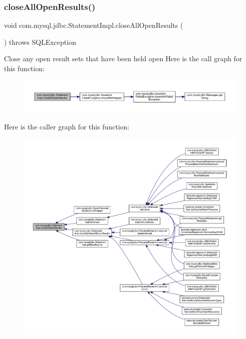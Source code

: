 \subsubsection{\texorpdfstring{close\+All\+Open\+Results()}{closeAllOpenResults()}}
{\footnotesize\ttfamily void com.\+mysql.\+jdbc.\+Statement\+Impl.\+close\+All\+Open\+Results (\begin{DoxyParamCaption}{ }\end{DoxyParamCaption}) throws S\+Q\+L\+Exception\hspace{0.3cm}{\ttfamily [protected]}}

Close any open result sets that have been \textquotesingle{}held open\textquotesingle{} Here is the call graph for this function\+:
\nopagebreak
\begin{figure}[H]
\begin{center}
\leavevmode
\includegraphics[width=350pt]{classcom_1_1mysql_1_1jdbc_1_1_statement_impl_a62c86a98fa9bd9792873a0d160e7ef59_cgraph}
\end{center}
\end{figure}
Here is the caller graph for this function\+:
\nopagebreak
\begin{figure}[H]
\begin{center}
\leavevmode
\includegraphics[width=350pt]{classcom_1_1mysql_1_1jdbc_1_1_statement_impl_a62c86a98fa9bd9792873a0d160e7ef59_icgraph}
\end{center}
\end{figure}
\mbox{\label{classcom_1_1mysql_1_1jdbc_1_1_statement_impl_a642ade7ecee90913b8de38602c43ce20}} 
